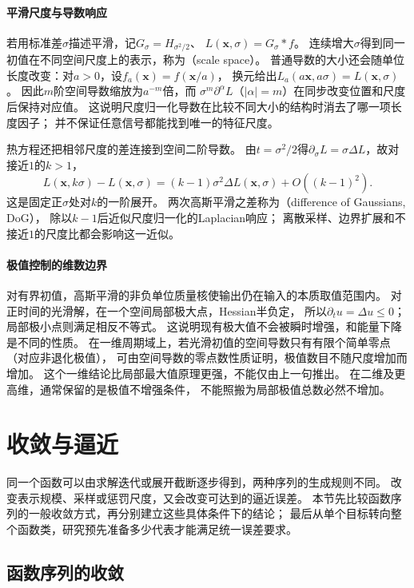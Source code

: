 \paragraph{平滑尺度与导数响应}
若用标准差$\sigma$描述平滑，记$G_\sigma=H_{\sigma^2/2}$、
$L(\bm x,\sigma)=G_\sigma*f$。
连续增大$\sigma$得到同一初值在不同空间尺度上的表示，称为（scale space）。
普通导数的大小还会随单位长度改变：对$a>0$，设$f_a(\bm x)=f(\bm x/a)$，
换元给出$L_a(a\bm x,a\sigma)=L(\bm x,\sigma)$。
因此$m$阶空间导数缩放为$a^{-m}$倍，而
$\sigma^m\partial^\alpha L$（$|\alpha|=m$）在同步改变位置和尺度后保持对应值。
这说明尺度归一化导数在比较不同大小的结构时消去了哪一项长度因子；
并不保证任意信号都能找到唯一的特征尺度。

热方程还把相邻尺度的差连接到空间二阶导数。
由$t=\sigma^2/2$得$\partial_\sigma L=\sigma\Delta L$，故对接近$1$的$k>1$，
\[
 L(\bm x,k\sigma)-L(\bm x,\sigma)
 =(k-1)\sigma^2\Delta L(\bm x,\sigma)
   +O((k-1)^2).
\]
这是固定正$\sigma$处对$k$的一阶展开。
两次高斯平滑之差称为（difference of Gaussians, DoG），
除以$k-1$后近似尺度归一化的Laplacian响应；
离散采样、边界扩展和不接近$1$的尺度比都会影响这一近似。

\paragraph{极值控制的维数边界}
对有界初值，高斯平滑的非负单位质量核使输出仍在输入的本质取值范围内。
对正时间的光滑解，在一个空间局部极大点，Hessian半负定，
所以$\partial_tu=\Delta u\leq0$；局部极小点则满足相反不等式。
这说明现有极大值不会被瞬时增强，和能量下降是不同的性质。
在一维周期域上，若光滑初值的空间导数只有有限个简单零点（对应非退化极值），
可由空间导数的零点数性质证明，极值数目不随尺度增加而增加。
这个一维结论比局部最大值原理更强，不能仅由上一句推出。
在二维及更高维，通常保留的是极值不增强条件，
不能照搬为局部极值总数必然不增加。

\section{收敛与逼近}
\label{sec:functional-convergence-approximation}

同一个函数可以由求解迭代或展开截断逐步得到，两种序列的生成规则不同。
改变表示规模、采样或惩罚尺度，又会改变可达到的逼近误差。
本节先比较函数序列的一般收敛方式，再分别建立这些具体条件下的结论；
最后从单个目标转向整个函数类，研究预先准备多少代表才能满足统一误差要求。

\subsection{函数序列的收敛}
\label{sec:functional-sequence-convergence}

